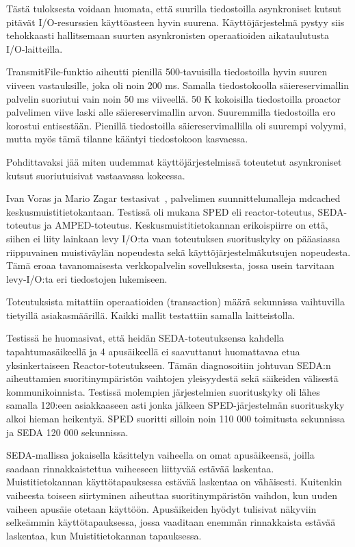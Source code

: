 \documentclass[finnish]{tktltiki2}
\theoremstyle{definition}
\theoremstyle{remark}
\begin{document}
Tästä tuloksesta voidaan huomata,
että suurilla tiedostoilla asynkroniset kutsut
pitävät I/O-resurssien käyttöasteen hyvin suurena.
Käyttöjärjestelmä pystyy siis tehokkaasti hallitsemaan
suurten asynkronisten operaatioiden aikataulutusta
I/O-laitteilla.

TransmitFile-funktio aiheutti pienillä 500-tavuisilla tiedostoilla hyvin suuren viiveen
vastauksille, joka oli noin 200 ms. Samalla tiedostokoolla säiereservimallin palvelin
suoriutui vain noin 50 ms viiveellä.
50 K kokoisilla tiedostoilla proactor
palvelimen viive laski alle säiereservimallin arvon.
Suuremmilla tiedostoilla
ero korostui entisestään.
Pienillä tiedostoilla säiereservimallilla oli suurempi
volyymi, mutta myös tämä tilanne kääntyi tiedostokoon kasvaessa.

Pohdittavaksi jää miten uudemmat käyttöjärjestelmissä
toteutetut asynkroniset kutsut suoriutuisivat 
vastaavassa kokeessa.

Ivan Voras ja Mario Zagar testasivat~\cite{voras_characteristics_2009},
palvelimen suunnittelumalleja mdcached keskusmuistitietokantaan.
Testissä oli mukana SPED eli reactor-toteutus, SEDA-toteutus ja AMPED-toteutus.
Keskusmuistitietokannan erikoispiirre on että, siihen ei liity lainkaan levy I/O:ta
vaan toteutuksen suorituskyky on pääasiassa riippuvainen muistiväylän nopeudesta sekä
käyttöjärjestelmäkutsujen nopeudesta. Tämä eroaa tavanomaisesta
verkkopalvelin sovelluksesta, jossa usein tarvitaan levy-I/O:ta 
eri tiedostojen lukemiseen.

Toteutuksista mitattiin operaatioiden (transaction) määrä sekunnissa vaihtuvilla tietyillä
asiakasmäärillä. Kaikki mallit testattiin samalla laitteistolla.

Testissä he huomasivat,
että heidän SEDA-toteutuksensa kahdella tapahtumasäikeellä ja 4 apusäikeellä
ei saavuttanut huomattavaa
etua yksinkertaiseen Reactor-toteutukseen. Tämän diagnosoitiin
johtuvan SEDA:n aiheuttamien suoritinympäristön vaihtojen yleisyydestä
sekä säikeiden välisestä kommunikoinnista.
Testissä molempien järjestelmien suorituskyky
oli lähes samalla 120:een asiakkaaseen asti jonka
jälkeen SPED-järjestelmän suorituskyky alkoi
hieman heikentyä. SPED suoritti silloin noin 110 000 toimitusta sekunnissa
ja SEDA 120 000 sekunnissa.

SEDA-mallissa jokaisella käsittelyn vaiheella on omat apusäikeensä,
joilla saadaan rinnakkaistettua vaiheeseen liittyvää estävää laskentaa.
Muistitietokannan käyttötapauksessa estävää laskentaa on vähäisesti.
Kuitenkin vaiheesta toiseen siirtyminen aiheuttaa suoritinympäristön vaihdon,
kun uuden vaiheen apusäie otetaan käyttöön.
Apusäikeiden hyödyt
tulisivat näkyviin selkeämmin käyttötapauksessa, jossa vaaditaan enemmän
rinnakkaista estävää laskentaa, kun Muistitietokannan tapauksessa.
\end{document}
